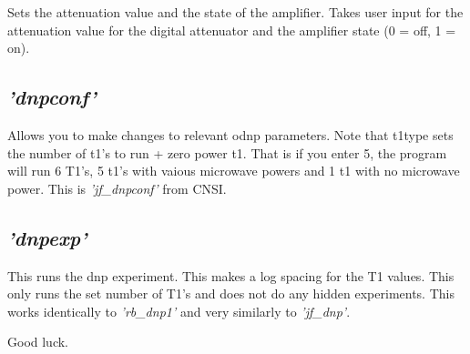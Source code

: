 \documentclass{article}
\newcommand{\fc}[1]{{\color{blue}\textit{'{#1}'}}}
\begin{document}
Sets the attenuation value and the state of the amplifier. Takes user input for the attenuation value for the digital attenuator and the amplifier state (0 = off, 1 = on).

\subsection{\fc{dnpconf}}

Allows you to make changes to relevant odnp parameters. Note that t1type sets the number of t1's to run + zero power t1. That is if you enter 5, the program will run 6 T1's, 5 t1's with vaious microwave powers and 1 t1 with no microwave power. This is \fc{jf\_dnpconf} from CNSI.

\subsection{\fc{dnpexp}}

This runs the dnp experiment. This makes a log spacing for the T1 values. This only runs the set number of T1's and does not do any hidden experiments. This works identically to \fc{rb\_dnp1} and very similarly to \fc{jf\_dnp}.


Good luck.
\end{document}
